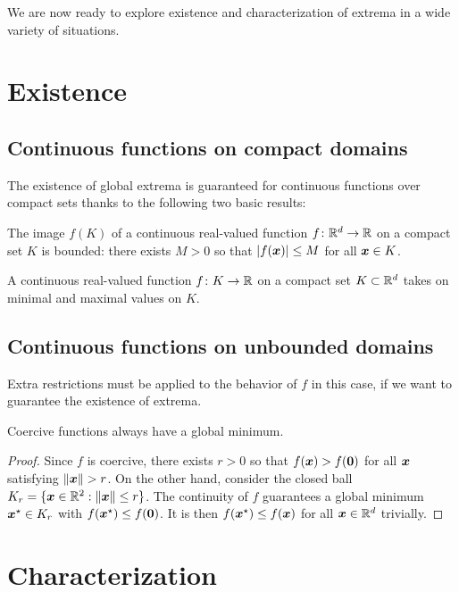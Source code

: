 We are now ready to explore existence and characterization of extrema in a wide variety of situations.

\section{Existence}
\subsection{Continuous functions on compact domains}
The existence of global extrema is guaranteed for continuous functions over compact sets thanks to the following two basic results:

\begin{theorem}\label{theorem:BVT}
The image $f(K)$ of a continuous real-valued function $f \colon \mathbb{R}^d \to \mathbb{R}$ on a compact set $K$ is bounded: there exists $M>0$ so that $\lvert  f(\boldsymbol{x})  \rvert \leq M$ for all $\boldsymbol{x} \in K$.
\end{theorem}

\begin{theorem}\label{theorem:EVT}
A continuous real-valued function $f \colon K \to \mathbb{R}$ on a compact set $K \subset \mathbb{R}^d$ takes on minimal and maximal values on $K$.
\end{theorem}

\subsection{Continuous functions on unbounded domains}
Extra restrictions must be applied to the behavior of $f$ in this case, if we want to guarantee the existence of extrema. 

\begin{theorem}\label{theorem:CoerciveFunctions}
Coercive functions always have a global minimum.
\end{theorem}
\begin{proof}
Since $f$ is coercive, there exists $r>0$ so that $f(\boldsymbol{x}) > f(\boldsymbol{0})$ for all $\boldsymbol{x}$ satisfying $\lVert \boldsymbol{x} \rVert>r$.  On the other hand, consider the closed ball $K_r = \{ \boldsymbol{x} \in \mathbb{R}^2 : \lVert \boldsymbol{x} \rVert \leq r \}$.  The continuity of $f$ guarantees a global minimum $\boldsymbol{x}^{\star} \in K_r$ with $f(\boldsymbol{x}^{\star}) \leq f(\boldsymbol{0})$.  It is then $f(\boldsymbol{x}^{\star}) \leq f(\boldsymbol{x})$ for all $\boldsymbol{x} \in \mathbb{R}^d$ trivially.
\end{proof}

\section{Characterization}


